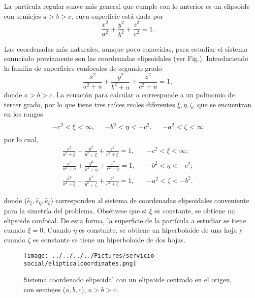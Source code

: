 \documentclass[paper=letter, fontsize=12pt,]{article}
\newcommand{\uvec}[1]{\hat{e}_{#1}}
\begin{document}
La partícula regular suave más general que cumple con lo anterior es un elipsoide con semiejes $a > b > c$, cuya superficie está dada por 
\begin{equation}
    \frac{x^2}{a^2}+\frac{y^2}{b^2}+\frac{z^2}{c^2}=1.
\end{equation}

Las coordenadas más naturales, aunque poco conocidas, para estudiar el sistema enunciado previamente son las coordenadas elipsoidales (ver Fig.). Introduciendo la familia de superficies confocales de segundo grado \cite{Math}
\begin{equation}
    \frac{x^2}{a^2+u}+\frac{y^2}{b^2+u}+\frac{z^2}{c^2+u}=1,
\end{equation}
donde $a>b>c$. La ecuación para calcular $u$ corresponde a un polinomio de tercer grado, por lo que tiene tres raíces reales diferentes $\xi,\eta,\zeta$, que se encuentran en los rangos
\begin{equation}
    -c^2<\xi<\infty,\hspace{0.5cm}-b^2<\eta<-c^2,\hspace{0.5cm}-a^2<\zeta<\infty
\end{equation}
por lo cual, 
\begin{align}
    \frac{x^2}{a^2+\xi}+\frac{y^2}{b^2+\xi}+\frac{z^2}{c^2+\xi}=1,&& -c^2<\xi<\infty;\\
    \frac{x^2}{a^2+\eta}+\frac{y^2}{b^2+\eta}+\frac{z^2}{c^2+\eta}=1,&& -b^2<\eta<-c^2;\\
    \frac{x^2}{a^2+\zeta}+\frac{y^2}{b^2+\zeta}+\frac{z^2}{c^2+\zeta}=1,&& -a^2<\zeta<-b^2.
\end{align}

donde ($\uvec{\xi},\uvec{\eta},\uvec{\zeta}$) corresponden al sistema de coordenadas elipsoidales  conveniente para la simetría del problema. Obsérvese que si $\xi$ es constante, se obtiene un elipsoide confocal. De esta forma, la superficie de la partícula a estudiar se tiene cuando $\xi=0$. Cuando $\eta$ es constante, se obtiene un hiperboloide de una hoja y cuando $\zeta$ es constante se tiene un hiperboloide de dos hojas.\\
\begin{figure}[H]
    \centering
    \texttt{[image: ../../../../Pictures/servicio social/elipticalcoordinates.png]} 
    \caption{Sistema coordenado elipsoidal con un elipsoide centrado en el origen, con semiejes ($a, b, c$), $a > b > c.$}
    \label{fig:enter-label}
\end{figure}
\end{document}
